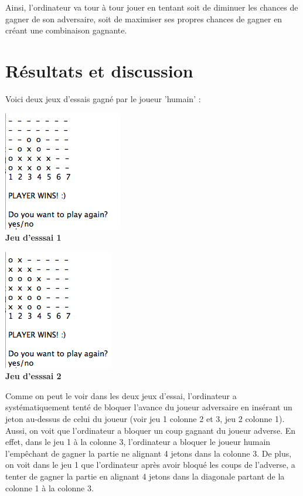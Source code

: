 \documentclass[12pt]{article}
\begin{document}
Ainsi, l'ordinateur va tour à tour jouer en tentant soit de diminuer les chances de gagner de son adversaire, soit de maximiser ses propres chances de gagner en créant une combinaison gagnante.

\section*{Résultats et discussion}
Voici deux jeux d'essais gagné par le joueur 'humain' : \\
\begin{center}
	\includegraphics[scale=0.6]{jeu1} \\
	\textbf{Jeu d'esssai 1}
\end{center}
\begin{center}
	\includegraphics[scale=0.7]{jeu2} \\
	\textbf{Jeu d'esssai 2}
\end{center}
Comme on peut le voir dans les deux jeux d'essai, l'ordinateur a systématiquement tenté de bloquer l'avance du joueur adversaire en insérant un jeton au-dessus de celui du joueur (voir jeu 1 colonne 2 et 3, jeu 2 colonne 1). Aussi, on voit que l'ordinateur a bloquer un coup gagnant du joueur adverse. En effet, dans le jeu 1 à la colonne 3, l'ordinateur a bloquer le joueur humain l'empêchant de gagner la partie ne alignant 4 jetons dans la colonne 3. De plus, on voit dans le jeu 1 que l'ordinateur après avoir bloqué les coups de l'adverse, a tenter de gagner la partie en alignant 4 jetons dans la diagonale partant de la colonne 1 à la colonne 3. \\
\end{document}
